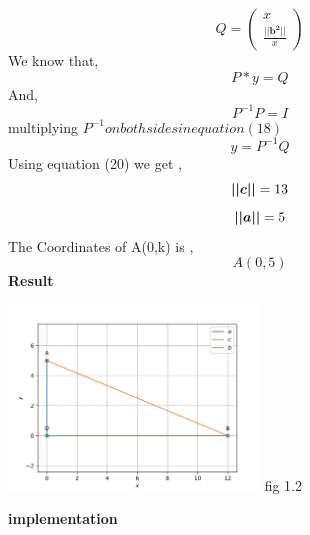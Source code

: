 \documentclass[10pt,a4paper]{report}
\begin{document}
\begin{multicols}{2}
\begin{equation}
  Q = \begin{pmatrix}
x\\
\frac{ \boldsymbol{||b^2||}}{x}
\end{pmatrix} 
\end{equation}\vspace{2mm}
We know that,\\
\begin{equation}
P * y = Q
\end{equation}
And,\\
\begin{equation}
P^{-1} P = I
\end{equation}
multiplying $P^{-1} on both sides in equation (18)$\\
\begin{equation}
 y = P^{-1} Q
\end{equation}
Using equation (20) we get ,
\begin{equation}
    \boldsymbol{||c||} = 13 \vspace{2mm}
\end{equation}
\begin{equation}
   \boldsymbol{||a||} = 5 \vspace{2mm}
\end{equation}
The Coordinates of A(0,k) is ,
\begin{equation}
  A(0,5)
\end{equation}
\textbf{Result} 
\begin{center}
 \includegraphics[width=0.5\textwidth]{matrix.jpg}  
 fig 1.2   \vspace{2mm}\\
 \end{center}\vspace{5mm}
 \vspace{2mm}  
\textbf{implementation}
\begin{center}
\setlength{\arrayrulewidth}{0.5mm}
\setlength{\tabcolsep}{5pt}
\renewcommand{\arraystretch}{3}
    \begin{tabular}{|l|c|}

\end{tabular}
\end{center}
\end{multicols}
\end{document}
